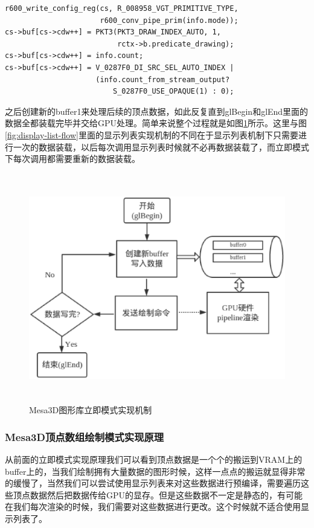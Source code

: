 \begin{lstlisting}
r600_write_config_reg(cs, R_008958_VGT_PRIMITIVE_TYPE,
                      r600_conv_pipe_prim(info.mode));
cs->buf[cs->cdw++] = PKT3(PKT3_DRAW_INDEX_AUTO, 1, 
                          rctx->b.predicate_drawing);
cs->buf[cs->cdw++] = info.count;
cs->buf[cs->cdw++] = V_0287F0_DI_SRC_SEL_AUTO_INDEX |
                     (info.count_from_stream_output? 
                         S_0287F0_USE_OPAQUE(1) : 0);
\end{lstlisting}

之后创建新的buffer1来处理后续的顶点数据，如此反复直到glBegin和glEnd里面的数据全都装载完毕并交给GPU处理。简单来说整个过程就是如图\ref{fig:immediate-mode-flow}所示。这里与图\ref{fig:display-list-flow}里面的显示列表实现机制的不同在于显示列表机制下只需要进行一次的数据装载，以后每次调用显示列表时候就不必再数据装载了，而立即模式下每次调用都需要重新的数据装载。

\begin{figure}[H] 
  \centering
  \includegraphics[width=14cm,height=10cm]{figures/chap03/immediate-mode-flow}
  \caption{Mesa3D图形库立即模式实现机制}
  \label{fig:immediate-mode-flow}
\end{figure}

\subsubsection{Mesa3D顶点数组绘制模式实现原理}
从前面的立即模式实现原理我们可以看到顶点数据是一个个的搬运到VRAM上的buffer上的，当我们绘制拥有大量数据的图形时候，这样一点点的搬运就显得非常的缓慢了，当然我们可以尝试使用显示列表来对这些数据进行预编译，需要遍历这些顶点数据然后把数据传给GPU的显存。但是这些数据不一定是静态的，有可能在我们每次渲染的时候，我们需要对这些数据进行更改。这个时候就不适合使用显示列表了。


